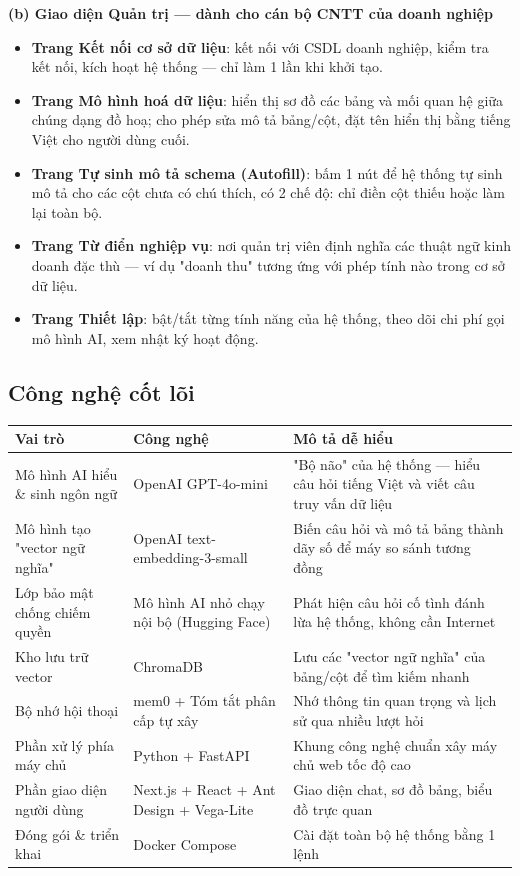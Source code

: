\documentclass[11pt,a4paper]{article}
\begin{document}
\textbf{(b) Giao diện Quản trị --- dành cho cán bộ CNTT của doanh nghiệp}
\begin{itemize}
\item \textbf{Trang Kết nối cơ sở dữ liệu}: kết nối với CSDL doanh nghiệp, kiểm tra kết nối, kích hoạt hệ thống --- chỉ làm 1 lần khi khởi tạo.
\item \textbf{Trang Mô hình hoá dữ liệu}: hiển thị sơ đồ các bảng và mối quan hệ giữa chúng dạng đồ hoạ; cho phép sửa mô tả bảng/cột, đặt tên hiển thị bằng tiếng Việt cho người dùng cuối.
\item \textbf{Trang Tự sinh mô tả schema (Autofill)}: bấm 1 nút để hệ thống tự sinh mô tả cho các cột chưa có chú thích, có 2 chế độ: chỉ điền cột thiếu hoặc làm lại toàn bộ.
\item \textbf{Trang Từ điển nghiệp vụ}: nơi quản trị viên định nghĩa các thuật ngữ kinh doanh đặc thù --- ví dụ "doanh thu" tương ứng với phép tính nào trong cơ sở dữ liệu.
\item \textbf{Trang Thiết lập}: bật/tắt từng tính năng của hệ thống, theo dõi chi phí gọi mô hình AI, xem nhật ký hoạt động.
\end{itemize}

\subsection{Công nghệ cốt lõi}

\begin{longtable}{|L{4cm}|L{4.5cm}|L{6cm}|}
\hline
{}\textbf{Vai trò} & \textbf{Công nghệ} & \textbf{Mô tả dễ hiểu} \\
\hline\endhead

Mô hình AI hiểu \& sinh ngôn ngữ & OpenAI GPT-4o-mini & "Bộ não" của hệ thống --- hiểu câu hỏi tiếng Việt và viết câu truy vấn dữ liệu \\ \hline
Mô hình tạo "vector ngữ nghĩa" & OpenAI text-embedding-3-small & Biến câu hỏi và mô tả bảng thành dãy số để máy so sánh tương đồng \\ \hline
Lớp bảo mật chống chiếm quyền & Mô hình AI nhỏ chạy nội bộ (Hugging Face) & Phát hiện câu hỏi cố tình đánh lừa hệ thống, không cần Internet \\ \hline
Kho lưu trữ vector & ChromaDB & Lưu các "vector ngữ nghĩa" của bảng/cột để tìm kiếm nhanh \\ \hline
Bộ nhớ hội thoại & mem0 + Tóm tắt phân cấp tự xây & Nhớ thông tin quan trọng và lịch sử qua nhiều lượt hỏi \\ \hline
Phần xử lý phía máy chủ & Python + FastAPI & Khung công nghệ chuẩn xây máy chủ web tốc độ cao \\ \hline
Phần giao diện người dùng & Next.js + React + Ant Design + Vega-Lite & Giao diện chat, sơ đồ bảng, biểu đồ trực quan \\ \hline
Đóng gói \& triển khai & Docker Compose & Cài đặt toàn bộ hệ thống bằng 1 lệnh \\ \hline

\end{longtable}
\end{document}
